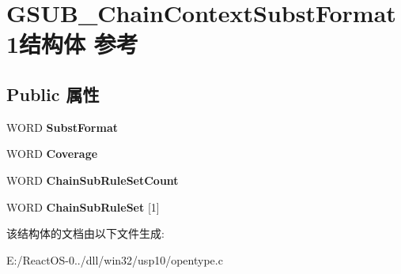 \hypertarget{struct_g_s_u_b___chain_context_subst_format1}{}\section{G\+S\+U\+B\+\_\+\+Chain\+Context\+Subst\+Format1结构体 参考}
\label{struct_g_s_u_b___chain_context_subst_format1}
\subsection*{Public 属性}
\begin{DoxyCompactItemize}
\item 
\mbox{\label{struct_g_s_u_b___chain_context_subst_format1_aded2cb267b6acee7f64e1834288325d0}} 
W\+O\+RD {\bfseries Subst\+Format}
\item 
\mbox{\label{struct_g_s_u_b___chain_context_subst_format1_a8ea74815ce971b11eec3d0b5ae5dcf81}} 
W\+O\+RD {\bfseries Coverage}
\item 
\mbox{\label{struct_g_s_u_b___chain_context_subst_format1_a71045f71e2c4566edb795e6c85d1e445}} 
W\+O\+RD {\bfseries Chain\+Sub\+Rule\+Set\+Count}
\item 
\mbox{\label{struct_g_s_u_b___chain_context_subst_format1_a4b5268db3d2c2722d7daeb0199019be4}} 
W\+O\+RD {\bfseries Chain\+Sub\+Rule\+Set} \mbox{[}1\mbox{]}
\end{DoxyCompactItemize}


该结构体的文档由以下文件生成\+:\begin{DoxyCompactItemize}
\item 
E\+:/\+React\+O\+S-\/0../dll/win32/usp10/opentype.\+c\end{DoxyCompactItemize}
